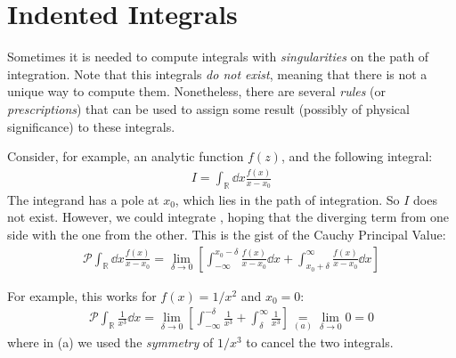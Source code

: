 \documentclass[../template.tex]{subfiles}
\begin{document}
\section{Indented Integrals}
Sometimes it is needed to compute integrals with \textit{singularities} on the path of integration. Note that this integrals \textit{do not exist}, meaning that there is not a unique way to compute them. Nonetheless, there are several \textit{rules} (or \textit{prescriptions}) that can be used to assign some result (possibly of physical significance) to these integrals.

\medskip

Consider, for example, an analytic function $f(z)$, and the following integral:
\begin{align*}
    I = \int_{\mathbb{R}} \dd{x} \frac{f(x)}{x-x_0} 
\end{align*}
The integrand has a pole at $x_0$, which lies in the path of integration. So $I$ does not exist. However, we could integrate , hoping that the diverging term from one side  with the one from the other. This is the gist of the Cauchy Principal Value:
\begin{align*}
    \mathcal{P}\int_\mathbb{R} \dd{x} \frac{f(x)}{x-x_0} = \lim_{\delta \to 0} \left[\int_{-\infty}^{x_0 - \delta} \frac{f(x)}{x - x_0} \dd{x} + \int_{x_0 + \delta}^\infty \frac{f(x)}{x-x_0} \dd{x}  \right]
\end{align*} 

For example, this works for $f(x) = 1/x^2$ and $x_0 = 0$:
\begin{align*}
    \mathcal{P}\int_\mathbb{R} \frac{1}{x^3} \dd{x} = \lim_{\delta \to 0} \left[\int_{-\infty}^{- \delta} \frac{1}{x^3} + \int_{\delta}^{\infty} \frac{1}{x^3}  \right]  \underset{(a)}{=}  \lim_{\delta \to 0} 0 = 0
\end{align*}
where in (a) we used the \textit{symmetry} of $1/x^3$ to cancel the two integrals.

\medskip
\end{document}
